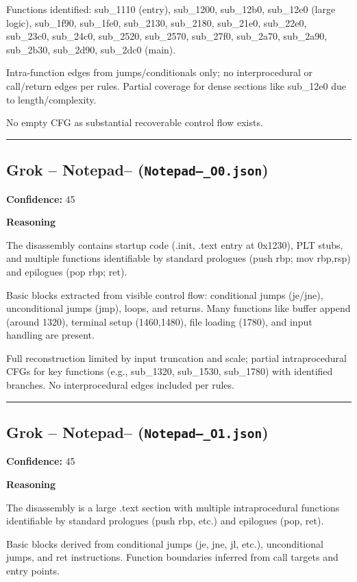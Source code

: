 Functions identified: sub\_1110 (entry), sub\_1200, sub\_12b0, sub\_12e0 (large logic), sub\_1f90, sub\_1fe0, sub\_2130, sub\_2180, sub\_21e0, sub\_22e0, sub\_23c0, sub\_24c0, sub\_2520, sub\_2570, sub\_27f0, sub\_2a70, sub\_2a90, sub\_2b30, sub\_2d90, sub\_2dc0 (main).

Intra-function edges from jumps/conditionals only; no interprocedural or call/return edges per rules. Partial coverage for dense sections like sub\_12e0 due to length/complexity.

No empty CFG as substantial recoverable control flow exists.

\bigskip
\hrule
\bigskip

\subsection{Grok -- Notepad-- (\texttt{Notepad--\_O0.json})}

\textbf{Confidence:} 45

\textbf{Reasoning}

The disassembly contains startup code (.init, .text entry at 0x1230), PLT stubs, and multiple functions identifiable by standard prologues (push rbp; mov rbp,rsp) and epilogues (pop rbp; ret).

Basic blocks extracted from visible control flow: conditional jumps (je/jne), unconditional jumps (jmp), loops, and returns. Many functions like buffer append (around 1320), terminal setup (1460,1480), file loading (1780), and input handling are present.

Full reconstruction limited by input truncation and scale; partial intraprocedural CFGs for key functions (e.g., sub\_1320, sub\_1530, sub\_1780) with identified branches. No interprocedural edges included per rules.

\bigskip
\hrule
\bigskip

\subsection{Grok -- Notepad-- (\texttt{Notepad--\_O1.json})}

\textbf{Confidence:} 45

\textbf{Reasoning}

The disassembly is a large .text section with multiple intraprocedural functions identifiable by standard prologues (push rbp, etc.) and epilogues (pop, ret).

Basic blocks derived from conditional jumps (je, jne, jl, etc.), unconditional jumps, and ret instructions. Function boundaries inferred from call targets and entry points.

